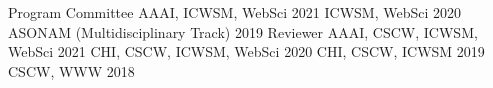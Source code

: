 \documentclass[letterpaper]{awesome-cv}
\begin{document}
\addvspace{2ex}
\begin{cventries}
  \cvaward
    {Program Committee}
    {AAAI, ICWSM, WebSci}
    {2021}
 \cvaward
    {}
    {ICWSM, WebSci}
    {2020}
 \cvaward
    {}
    {ASONAM (Multidisciplinary Track)}
    {2019}
  \cvaward
    {Reviewer}
    {AAAI, CSCW, ICWSM, WebSci}
    {2021}
  \cvaward
    {}
    {CHI, CSCW, ICWSM, WebSci}
    {2020}
  \cvaward
    {}
    {CHI, CSCW, ICWSM}
    {2019}
  \cvaward
    {}
    {CSCW, WWW}
    {2018}
\end{cventries}
\end{document}
